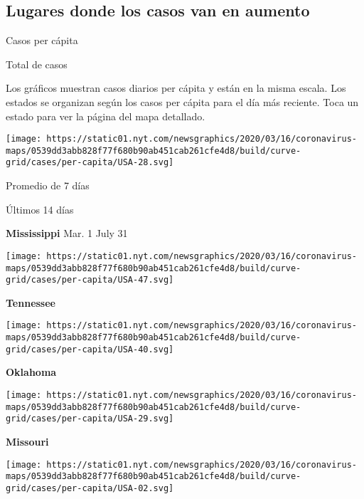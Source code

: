 \hypertarget{lugares-donde-los-casos-van-en-aumento}{%
\subsection{Lugares donde los casos van en
aumento}\label{lugares-donde-los-casos-van-en-aumento}}

Casos per cápita

Total de casos

Los gráficos muestran casos diarios per cápita y están en la misma
escala. Los estados se organizan según los casos per cápita para el día
más reciente. Toca un estado para ver la página del mapa detallado.

\href{https://www.nytimes.com/interactive/2020/us/mississippi-coronavirus-cases.html}{}

\texttt{[image: https://static01.nyt.com/newsgraphics/2020/03/16/coronavirus-maps/0539dd3abb828f77f680b90ab451cab261cfe4d8/build/curve-grid/cases/per-capita/USA-28.svg]}

Promedio de 7 días

Últimos 14 días

\textbf{Mississippi} Mar. 1 July 31

\href{https://www.nytimes.com/interactive/2020/us/tennessee-coronavirus-cases.html}{}

\texttt{[image: https://static01.nyt.com/newsgraphics/2020/03/16/coronavirus-maps/0539dd3abb828f77f680b90ab451cab261cfe4d8/build/curve-grid/cases/per-capita/USA-47.svg]}

\textbf{Tennessee}

\href{https://www.nytimes.com/interactive/2020/us/oklahoma-coronavirus-cases.html}{}

\texttt{[image: https://static01.nyt.com/newsgraphics/2020/03/16/coronavirus-maps/0539dd3abb828f77f680b90ab451cab261cfe4d8/build/curve-grid/cases/per-capita/USA-40.svg]}

\textbf{Oklahoma}

\href{https://www.nytimes.com/interactive/2020/us/missouri-coronavirus-cases.html}{}

\texttt{[image: https://static01.nyt.com/newsgraphics/2020/03/16/coronavirus-maps/0539dd3abb828f77f680b90ab451cab261cfe4d8/build/curve-grid/cases/per-capita/USA-29.svg]}

\textbf{Missouri}

\href{https://www.nytimes.com/interactive/2020/us/alaska-coronavirus-cases.html}{}

\texttt{[image: https://static01.nyt.com/newsgraphics/2020/03/16/coronavirus-maps/0539dd3abb828f77f680b90ab451cab261cfe4d8/build/curve-grid/cases/per-capita/USA-02.svg]}

